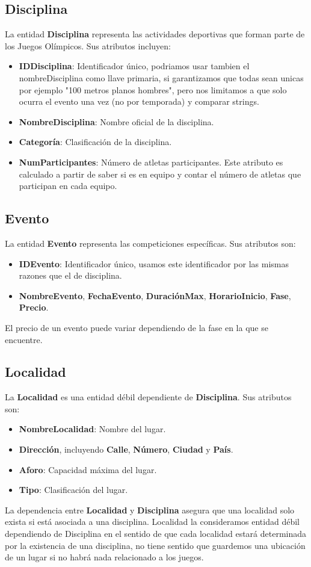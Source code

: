 \subsection*{Disciplina}
La entidad \textbf{Disciplina} representa las actividades deportivas que forman parte de los Juegos Olímpicos. Sus atributos incluyen:
\begin{itemize}
    \item \textbf{IDDisciplina}: Identificador único, podriamos usar tambien el nombreDisciplina como llave primaria, si garantizamos que todas sean unicas por ejemplo "100 metros planos hombres", pero nos limitamos a que solo ocurra el evento una vez (no por temporada) y comparar strings.
    \item \textbf{NombreDisciplina}: Nombre oficial de la disciplina.
    \item \textbf{Categoría}: Clasificación de la disciplina.
    \item \textbf{NumParticipantes}: Número de atletas participantes. Este atributo es calculado a partir de saber si es en equipo y contar el número de atletas que participan en cada equipo.
\end{itemize}

\subsection*{Evento}
La entidad \textbf{Evento} representa las competiciones específicas. Sus atributos son:
\begin{itemize}
    \item \textbf{IDEvento}: Identificador único, usamos este identificador por las mismas razones que el de disciplina.
    \item \textbf{NombreEvento}, \textbf{FechaEvento}, \textbf{DuraciónMax}, \textbf{HorarioInicio}, \textbf{Fase}, \textbf{Precio}.
\end{itemize}
El precio de un evento puede variar dependiendo de la fase en la que se encuentre.

\subsection*{Localidad}
La \textbf{Localidad} es una entidad débil dependiente de \textbf{Disciplina}. Sus atributos son:
\begin{itemize}
    \item \textbf{NombreLocalidad}: Nombre del lugar.
    \item \textbf{Dirección}, incluyendo \textbf{Calle}, \textbf{Número}, \textbf{Ciudad} y \textbf{País}.
    \item \textbf{Aforo}: Capacidad máxima del lugar.
    \item \textbf{Tipo}: Clasificación del lugar.
\end{itemize}
La dependencia entre \textbf{Localidad} y \textbf{Disciplina} asegura que una localidad solo exista si está asociada a una disciplina. Localidad la consideramos entidad débil dependiendo de Disciplina en el sentido de que cada localidad estará determinada por la existencia de una disciplina, no tiene sentido que guardemos una ubicación de un lugar si no habrá nada relacionado a los juegos. \vspace{0.3cm}

